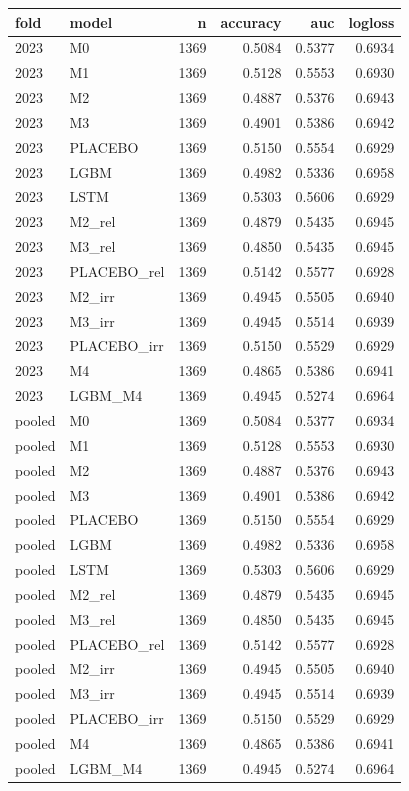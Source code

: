 \begin{tabular}{llrrrr}
\toprule
fold & model & n & accuracy & auc & logloss \\
\midrule
2023 & M0 & 1369 & 0.5084 & 0.5377 & 0.6934 \\
2023 & M1 & 1369 & 0.5128 & 0.5553 & 0.6930 \\
2023 & M2 & 1369 & 0.4887 & 0.5376 & 0.6943 \\
2023 & M3 & 1369 & 0.4901 & 0.5386 & 0.6942 \\
2023 & PLACEBO & 1369 & 0.5150 & 0.5554 & 0.6929 \\
2023 & LGBM & 1369 & 0.4982 & 0.5336 & 0.6958 \\
2023 & LSTM & 1369 & 0.5303 & 0.5606 & 0.6929 \\
2023 & M2\_rel & 1369 & 0.4879 & 0.5435 & 0.6945 \\
2023 & M3\_rel & 1369 & 0.4850 & 0.5435 & 0.6945 \\
2023 & PLACEBO\_rel & 1369 & 0.5142 & 0.5577 & 0.6928 \\
2023 & M2\_irr & 1369 & 0.4945 & 0.5505 & 0.6940 \\
2023 & M3\_irr & 1369 & 0.4945 & 0.5514 & 0.6939 \\
2023 & PLACEBO\_irr & 1369 & 0.5150 & 0.5529 & 0.6929 \\
2023 & M4 & 1369 & 0.4865 & 0.5386 & 0.6941 \\
2023 & LGBM\_M4 & 1369 & 0.4945 & 0.5274 & 0.6964 \\
pooled & M0 & 1369 & 0.5084 & 0.5377 & 0.6934 \\
pooled & M1 & 1369 & 0.5128 & 0.5553 & 0.6930 \\
pooled & M2 & 1369 & 0.4887 & 0.5376 & 0.6943 \\
pooled & M3 & 1369 & 0.4901 & 0.5386 & 0.6942 \\
pooled & PLACEBO & 1369 & 0.5150 & 0.5554 & 0.6929 \\
pooled & LGBM & 1369 & 0.4982 & 0.5336 & 0.6958 \\
pooled & LSTM & 1369 & 0.5303 & 0.5606 & 0.6929 \\
pooled & M2\_rel & 1369 & 0.4879 & 0.5435 & 0.6945 \\
pooled & M3\_rel & 1369 & 0.4850 & 0.5435 & 0.6945 \\
pooled & PLACEBO\_rel & 1369 & 0.5142 & 0.5577 & 0.6928 \\
pooled & M2\_irr & 1369 & 0.4945 & 0.5505 & 0.6940 \\
pooled & M3\_irr & 1369 & 0.4945 & 0.5514 & 0.6939 \\
pooled & PLACEBO\_irr & 1369 & 0.5150 & 0.5529 & 0.6929 \\
pooled & M4 & 1369 & 0.4865 & 0.5386 & 0.6941 \\
pooled & LGBM\_M4 & 1369 & 0.4945 & 0.5274 & 0.6964 \\
\bottomrule
\end{tabular}
